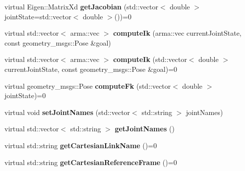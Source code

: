 \begin{DoxyCompactItemize}
\item 
virtual Eigen\+::\+Matrix\+Xd {\bfseries get\+Jacobian} (std\+::vector$<$ double $>$ joint\+State=std\+::vector$<$ double $>$())=0\hypertarget{classkukadu_1_1Kinematics_a16c8379a7ee87657a5f3db5b7534391b}{}\label{classkukadu_1_1Kinematics_a16c8379a7ee87657a5f3db5b7534391b}

\item 
virtual std\+::vector$<$ arma\+::vec $>$ {\bfseries compute\+Ik} (arma\+::vec current\+Joint\+State, const geometry\+\_\+msgs\+::\+Pose \&goal)\hypertarget{classkukadu_1_1Kinematics_ac9215d036bbdfab163745ade3033910e}{}\label{classkukadu_1_1Kinematics_ac9215d036bbdfab163745ade3033910e}

\item 
virtual std\+::vector$<$ arma\+::vec $>$ {\bfseries compute\+Ik} (std\+::vector$<$ double $>$ current\+Joint\+State, const geometry\+\_\+msgs\+::\+Pose \&goal)=0\hypertarget{classkukadu_1_1Kinematics_a5b143f7db7a84d7caa03419043426a5e}{}\label{classkukadu_1_1Kinematics_a5b143f7db7a84d7caa03419043426a5e}

\item 
virtual geometry\+\_\+msgs\+::\+Pose {\bfseries compute\+Fk} (std\+::vector$<$ double $>$ joint\+State)=0\hypertarget{classkukadu_1_1Kinematics_aa80b36c16d23f6031f9b133ed72795f2}{}\label{classkukadu_1_1Kinematics_aa80b36c16d23f6031f9b133ed72795f2}

\item 
virtual void {\bfseries set\+Joint\+Names} (std\+::vector$<$ std\+::string $>$ joint\+Names)\hypertarget{classkukadu_1_1Kinematics_a12859eb774a27710b71b70fd883f5d53}{}\label{classkukadu_1_1Kinematics_a12859eb774a27710b71b70fd883f5d53}

\item 
virtual std\+::vector$<$ std\+::string $>$ {\bfseries get\+Joint\+Names} ()\hypertarget{classkukadu_1_1Kinematics_a888c5039b2db5c1f5964753c2474efbd}{}\label{classkukadu_1_1Kinematics_a888c5039b2db5c1f5964753c2474efbd}

\item 
virtual std\+::string {\bfseries get\+Cartesian\+Link\+Name} ()=0\hypertarget{classkukadu_1_1Kinematics_a03901fc799987b5840de994cfc7d7260}{}\label{classkukadu_1_1Kinematics_a03901fc799987b5840de994cfc7d7260}

\item 
virtual std\+::string {\bfseries get\+Cartesian\+Reference\+Frame} ()=0\hypertarget{classkukadu_1_1Kinematics_a933b787ca3d264cdcfec9245a90744aa}{}\label{classkukadu_1_1Kinematics_a933b787ca3d264cdcfec9245a90744aa}

\end{DoxyCompactItemize}

